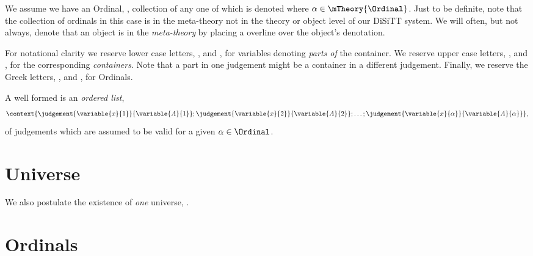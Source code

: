 \documentclass[a4paper,openany]{amsbook}
\begin{document}
We assume we have an Ordinal, \mTheory{\Ordinal}, collection of
 any one of which is denoted  where
$\alpha \in \mTheory{\Ordinal}$. Just to be definite, note that the collection
of ordinals in this case is in the meta-theory not in the theory or object level
of our DiSiTT system. We will often, but not always, denote that an object is in
the \emph{meta-theory} by placing a overline over the object's denotation.

For notational clarity we reserve lower case letters, ,
 and , for variables denoting \emph{parts of} the
container. We reserve upper case letters, ,  and
, for the corresponding \emph{containers}. Note that a part in one
judgement might be a container in a different judgement. Finally, we reserve the
Greek letters, \variable{\alpha}{}, \variable{\beta}{} and \variable{\gamma}{},
for Ordinals.

A well formed  is an \emph{ordered list}, %
\[\context{ %
 \judgement{\variable{x}{1}}{\variable{A}{1}} ; %
 \judgement{\variable{x}{2}}{\variable{A}{2}} ; %
 \ldots ; %
 \judgement{\variable{x}{\alpha}}{\variable{A}{\alpha}}
},\] %
of judgements which are assumed to be valid for a given $\alpha \in \Ordinal$.

\begin{deAxiom}
\conclusion{}{\cJudgement{\cdot}}
\end{deAxiom}

\begin{deAxiom}
\end{deAxiom}

\chapter{Universe}

We also postulate the existence of \emph{one} universe, \Universe{}{}. %
\begin{deAxiom} %
\conclusion{}{ %
  \Universe{}{} %
} %
\end{deAxiom} %

\chapter{Ordinals}
\end{document}
